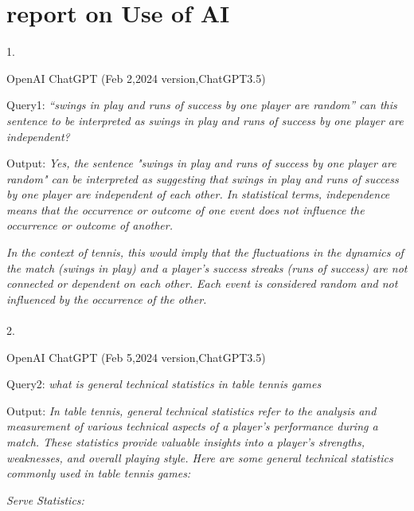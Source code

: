 \section{report on Use of AI}

1.

OpenAI ChatGPT (Feb 2,2024 version,ChatGPT3.5)

Query1:  \emph{
    “swings in play and runs of success by one player are random” 
can this sentence to be interpreted as  swings in play and runs of success by one player are independent?
}

Output: \emph{Yes, the sentence "swings in play and runs of success by one player are random" 
can be interpreted as suggesting that swings in play and runs of success by one player are 
independent of each other. In statistical terms, independence means that the occurrence or 
outcome of one event does not influence the occurrence or outcome of another.}

\emph{
In the context of tennis, this would imply that the fluctuations in the dynamics of the match 
(swings in play) and a player's success streaks (runs of success) are not connected or dependent 
on each other. Each event is considered random and not influenced by the occurrence of the other.
}
\\ \hspace*{\fill} \\
2.

OpenAI ChatGPT (Feb 5,2024 version,ChatGPT3.5)

Query2:
\emph{
    what is general technical statistics in table tennis games
}

Output:
\emph{In table tennis, general technical statistics refer to the analysis 
and measurement of various technical aspects of a player's performance during a match. 
These statistics provide valuable insights into a player's strengths, weaknesses, 
and overall playing style. Here are some general technical statistics commonly used 
in table tennis games:}

\emph{Serve Statistics:}

